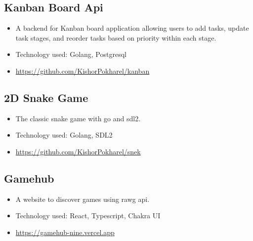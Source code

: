 \documentclass[11pt,a4paper]{article}
\begin{document}
\subsection*{Kanban Board Api}
\begin{itemize}[leftmargin=*, noitemsep]
    \item A backend for Kanban board application allowing users to add tasks, update task stages, and reorder tasks based on priority within each stage.
    \item Technology used: Golang, Postgresql
    \item \href{https://github.com/KishorPokharel/kanban}{https://github.com/KishorPokharel/kanban}
\end{itemize}

\subsection*{2D Snake Game}
\begin{itemize}[leftmargin=*, noitemsep]
    \item The classic snake game with go and sdl2.
    \item Technology used: Golang, SDL2
    \item \href{https://github.com/KishorPokharel/snek}{https://github.com/KishorPokharel/snek}
\end{itemize}

\subsection*{Gamehub}
\begin{itemize}[leftmargin=*, noitemsep]
    \item A website to discover games using rawg api.
    \item Technology used: React, Typescript, Chakra UI
    \item \href{https://gamehub-nine.vercel.app}{https://gamehub-nine.vercel.app}
\end{itemize}
\end{document}
